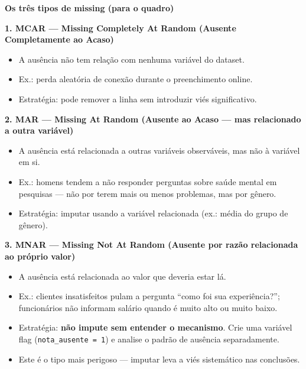\begin{BoardBox}
\textbf{Os três tipos de missing (para o quadro)}

\textbf{1. MCAR — Missing Completely At Random (Ausente Completamente ao Acaso)}
\begin{itemize}
  \item A ausência não tem relação com nenhuma variável do dataset.
  \item Ex.: perda aleatória de conexão durante o preenchimento online.
  \item Estratégia: pode remover a linha sem introduzir viés significativo.
\end{itemize}

\textbf{2. MAR — Missing At Random (Ausente ao Acaso — mas relacionado a outra variável)}
\begin{itemize}
  \item A ausência está relacionada a outras variáveis observáveis, mas não à
  variável em si.
  \item Ex.: homens tendem a não responder perguntas sobre saúde mental em
  pesquisas — não por terem mais ou menos problemas, mas por gênero.
  \item Estratégia: imputar usando a variável relacionada (ex.: média do grupo de gênero).
\end{itemize}

\textbf{3. MNAR — Missing Not At Random (Ausente por razão relacionada ao próprio valor)}
\begin{itemize}
  \item A ausência está relacionada ao valor que deveria estar lá.
  \item Ex.: clientes insatisfeitos pulam a pergunta ``como foi sua experiência?'';
  funcionários não informam salário quando é muito alto ou muito baixo.
  \item Estratégia: \textbf{não impute sem entender o mecanismo}. Crie uma variável
  flag (\texttt{nota\_ausente = 1}) e analise o padrão de ausência separadamente.
  \item Este é o tipo mais perigoso — imputar leva a viés sistemático nas conclusões.
\end{itemize}
\end{BoardBox}


